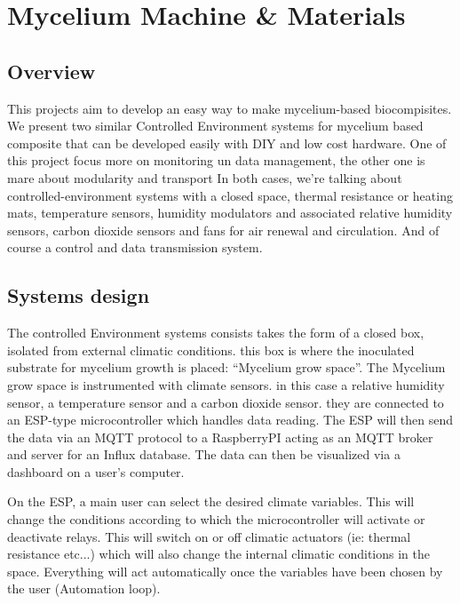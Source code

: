 \chapter{Mycelium Machine \& Materials}


\section{Overview}

This projects aim to develop an easy way to make mycelium-based biocompisites. We present two similar Controlled Environment systems for mycelium based composite that can be developed easily with DIY and low cost hardware.
One of this project focus more on monitoring un data management, the other one is mare about modularity and transport 
In both cases, we're talking about controlled-environment systems with a closed space, thermal resistance or heating mats, temperature sensors, humidity modulators and associated relative humidity sensors, carbon dioxide sensors and fans for air renewal and circulation. 
And of course a control and data transmission system. 


\section{Systems design}

The controlled Environment systems consists takes the form of a closed box, isolated from external climatic conditions. this box is where the inoculated substrate for mycelium growth is placed: “Mycelium grow space”. 
The Mycelium grow space is instrumented with climate sensors. in this case a relative humidity sensor, a temperature sensor and a carbon dioxide sensor. they are connected to an ESP-type microcontroller which handles data reading.
The ESP will then send the data via an MQTT protocol to a RaspberryPI acting as an MQTT broker and server for an Influx database. The data can then be visualized via a dashboard on a user's computer. 

On the ESP, a main user can select the desired climate variables. This will change the conditions according to which the microcontroller will activate or deactivate relays. This will switch on or off climatic actuators (ie: thermal resistance etc...) which will also change the internal climatic conditions in the space.  
Everything will act automatically once the variables have been chosen by the user (Automation loop). 

